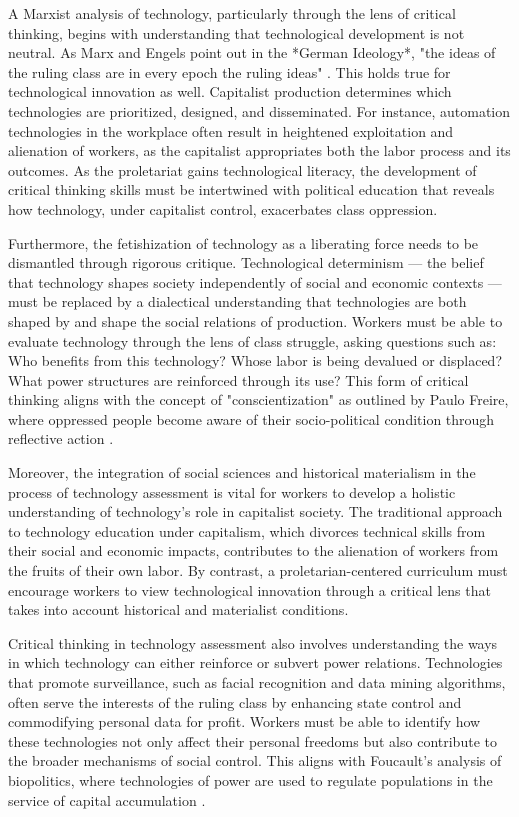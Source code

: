 \begin{refsection}
A Marxist analysis of technology, particularly through the lens of critical thinking, begins with understanding that technological development is not neutral. As Marx and Engels point out in the *German Ideology*, "the ideas of the ruling class are in every epoch the ruling ideas" \cite[pp.~47]{marx_german_ideology}. This holds true for technological innovation as well. Capitalist production determines which technologies are prioritized, designed, and disseminated. For instance, automation technologies in the workplace often result in heightened exploitation and alienation of workers, as the capitalist appropriates both the labor process and its outcomes. As the proletariat gains technological literacy, the development of critical thinking skills must be intertwined with political education that reveals how technology, under capitalist control, exacerbates class oppression.

Furthermore, the fetishization of technology as a liberating force needs to be dismantled through rigorous critique. Technological determinism — the belief that technology shapes society independently of social and economic contexts — must be replaced by a dialectical understanding that technologies are both shaped by and shape the social relations of production. Workers must be able to evaluate technology through the lens of class struggle, asking questions such as: Who benefits from this technology? Whose labor is being devalued or displaced? What power structures are reinforced through its use? This form of critical thinking aligns with the concept of "conscientization" as outlined by Paulo Freire, where oppressed people become aware of their socio-political condition through reflective action \cite[pp.~101]{freire_pedagogy}.

Moreover, the integration of social sciences and historical materialism in the process of technology assessment is vital for workers to develop a holistic understanding of technology's role in capitalist society. The traditional approach to technology education under capitalism, which divorces technical skills from their social and economic impacts, contributes to the alienation of workers from the fruits of their own labor. By contrast, a proletarian-centered curriculum must encourage workers to view technological innovation through a critical lens that takes into account historical and materialist conditions.

Critical thinking in technology assessment also involves understanding the ways in which technology can either reinforce or subvert power relations. Technologies that promote surveillance, such as facial recognition and data mining algorithms, often serve the interests of the ruling class by enhancing state control and commodifying personal data for profit. Workers must be able to identify how these technologies not only affect their personal freedoms but also contribute to the broader mechanisms of social control. This aligns with Foucault’s analysis of biopolitics, where technologies of power are used to regulate populations in the service of capital accumulation \cite[pp.~139]{foucault_discipline_punish}. 


\end{refsection}

